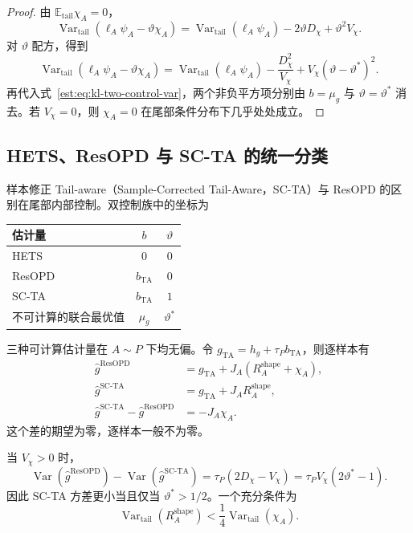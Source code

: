 \documentclass[lang=cn,scheme=chinese,openany]{../book/elegantbook}
\newcommand{\E}{\mathbb E}
\newcommand{\Var}{\operatorname{Var}}
\newcommand{\tail}{\mathrm{tail}}
\begin{document}
\begin{proof}
由 $\E_{\tail}\chi_A=0$，
\begin{equation*}
 \Var_{\tail}(\ell_A\psi_A-\vartheta \chi_A)
 =\Var_{\tail}(\ell_A\psi_A)-2\vartheta D_\chi+\vartheta^2V_\chi.
\end{equation*}
对 $\vartheta$ 配方，得到
\begin{equation*}
 \Var_{\tail}(\ell_A\psi_A-\vartheta \chi_A)
 =\Var_{\tail}(\ell_A\psi_A)-\frac{D_\chi^2}{V_\chi}
  +V_\chi(\vartheta-\vartheta^*)^2.
\end{equation*}
再代入式~\eqref{est:eq:kl-two-control-var}，两个非负平方项分别由 $b=\mu_g$ 与 $\vartheta=\vartheta^*$ 消去。若 $V_\chi=0$，则 $\chi_A=0$ 在尾部条件分布下几乎处处成立。
\end{proof}

\subsection{HETS、ResOPD 与 SC-TA 的统一分类}

样本修正 Tail-aware（Sample-Corrected Tail-Aware，SC-TA）与 ResOPD 的区别在尾部内部控制。双控制族中的坐标为
\begin{center}
\begin{tabular}{lcc}
\toprule
估计量 & $b$ & $\vartheta$\\
\midrule
HETS & $0$ & $0$\\
ResOPD & $b_{\mathrm{TA}}$ & $0$\\
SC-TA & $b_{\mathrm{TA}}$ & $1$\\
不可计算的联合最优值 & $\mu_g$ & $\vartheta^*$\\
\bottomrule
\end{tabular}
\end{center}
三种可计算估计量在 $A\sim P$ 下均无偏。令 $g_{\mathrm{TA}}=h_g+\tau_Pb_{\mathrm{TA}}$，则逐样本有
\begin{align*}
 \widehat g^{\mathrm{ResOPD}}&=g_{\mathrm{TA}}+J_A(R_A^{\mathrm{shape}}+\chi_A),\\
 \widehat g^{\mathrm{SC\text{-}TA}}&=g_{\mathrm{TA}}+J_AR_A^{\mathrm{shape}},\\
 \widehat g^{\mathrm{SC\text{-}TA}}-\widehat g^{\mathrm{ResOPD}}&=-J_A\chi_A.
\end{align*}
这个差的期望为零，逐样本一般不为零。

\begin{proposition}
当 $V_\chi>0$ 时，
\begin{equation*}
 \Var(\widehat g^{\mathrm{ResOPD}})
 -\Var(\widehat g^{\mathrm{SC\text{-}TA}})
 =\tau_P(2D_\chi-V_\chi)
 =\tau_PV_\chi(2\vartheta^*-1).
\end{equation*}
因此 SC-TA 方差更小当且仅当 $\vartheta^*>1/2$。一个充分条件为
\begin{equation*}
 \Var_{\tail}(R_A^{\mathrm{shape}})<\frac14\Var_{\tail}(\chi_A).
\end{equation*}
\end{proposition}
\end{document}
